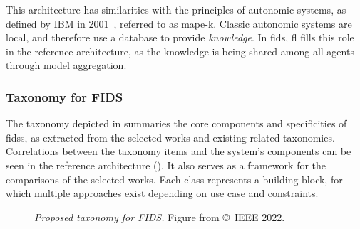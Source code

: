 This architecture has similarities with the principles of autonomic systems, as defined by IBM in 2001~\cite{kephart_visionautonomiccomputing_2003}, referred to as \gls{mape-k}.
Classic autonomic systems are local, and therefore use a database to provide \emph{knowledge}.
In \gls{fids}, \gls{fl} fills this role in the reference architecture, as the knowledge is being shared among all agents through model aggregation.


\subsubsection{Taxonomy for FIDS\label{sec:sota.discuss.synthesis.taxo}}

The taxonomy depicted in  summaries the core components and specificities of \glspl{fids}, as extracted from the selected works and existing related taxonomies.
Correlations between the taxonomy items and the system's components can be seen in the reference architecture ().
It also serves as a framework for the comparisons of the selected works.
Each class represents a building block, for which multiple approaches exist depending on use case and constraints.

\begin{figure}
  \centering
  \resizebox{\textwidth}{!}{}
  \caption[
    Proposed taxonomy for FIDS.
  ]{
   \emph{Proposed taxonomy for FIDS.}
    Figure from \textcite{lavaur_tnsm_2022} \copyright~IEEE 2022.
    \label{fig:sota.taxonomy}
  }
\end{figure}



